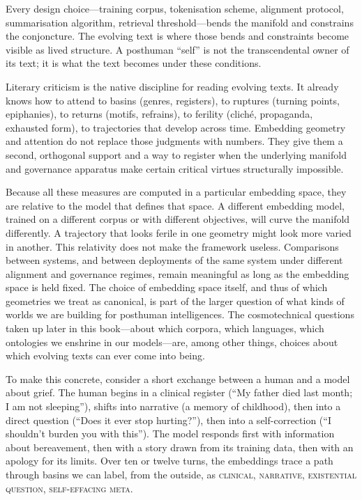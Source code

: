 \documentclass[12pt,a4paper]{article}
\begin{document}
Every design choice---training corpus, tokenisation scheme, alignment protocol, summarisation algorithm, retrieval threshold---bends the manifold and constrains the conjoncture. The evolving text is where those bends and constraints become visible as lived structure. A posthuman ``self'' is not the transcendental owner of its text; it is what the text becomes under these conditions.

Literary criticism is the native discipline for reading evolving texts. It already knows how to attend to basins (genres, registers), to ruptures (turning points, epiphanies), to returns (motifs, refrains), to ferility (clich\'e, propaganda, exhausted form), to trajectories that develop across time. Embedding geometry and attention do not replace those judgments with numbers. They give them a second, orthogonal support and a way to register when the underlying manifold and governance apparatus make certain critical virtues structurally impossible.

Because all these measures are computed in a particular embedding space, they are relative to the model that defines that space. A different embedding model, trained on a different corpus or with different objectives, will curve the manifold differently. A trajectory that looks ferile in one geometry might look more varied in another. This relativity does not make the framework useless. Comparisons between systems, and between deployments of the same system under different alignment and governance regimes, remain meaningful as long as the embedding space is held fixed. The choice of embedding space itself, and thus of which geometries we treat as canonical, is part of the larger question of what kinds of worlds we are building for posthuman intelligences. The cosmotechnical questions taken up later in this book---about which corpora, which languages, which ontologies we enshrine in our models---are, among other things, choices about which evolving texts can ever come into being.

To make this concrete, consider a short exchange between a human and a model about grief. The human begins in a clinical register (``My father died last month; I am not sleeping''), shifts into narrative (a memory of childhood), then into a direct question (``Does it ever stop hurting?''), then into a self-correction (``I shouldn't burden you with this''). The model responds first with information about bereavement, then with a story drawn from its training data, then with an apology for its limits. Over ten or twelve turns, the embeddings trace a path through basins we can label, from the outside, as \textsc{clinical}, \textsc{narrative}, \textsc{existential question}, \textsc{self-effacing meta}.
\end{document}
